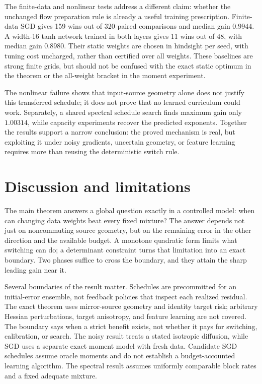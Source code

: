 \documentclass{article}
\theoremstyle{remark}\newtheorem{remark}[theorem]{Remark}
\begin{document}
The finite-data and nonlinear tests address a different claim: whether the unchanged flow preparation rule is already a useful training prescription. Finite-data SGD gives 159 wins out of 320 paired comparisons and median gain $0.9944$. A width-16 tanh network trained in both layers gives 11 wins out of 48, with median gain $0.8980$. Their static weights are chosen in hindsight per seed, with tuning cost uncharged, rather than certified over all weights. These baselines are strong finite grids, but should not be confused with the exact static optimum in the theorem or the all-weight bracket in the moment experiment.

The nonlinear failure shows that input-source geometry alone does not justify this transferred schedule; it does not prove that no learned curriculum could work. Separately, a shared spectral schedule search finds maximum gain only $1.00314$, while capacity experiments recover the predicted exponents. Together the results support a narrow conclusion: the proved mechanism is real, but exploiting it under noisy gradients, uncertain geometry, or feature learning requires more than reusing the deterministic switch rule.

\section{Discussion and limitations}\label{sec:discussion}
The main theorem answers a global question exactly in a controlled model: when can changing data weights beat every fixed mixture? The answer depends not just on noncommuting source geometry, but on the remaining error in the other direction and the available budget. A monotone quadratic form limits what switching can do; a determinant constraint turns that limitation into an exact boundary. Two phases suffice to cross the boundary, and they attain the sharp leading gain near it.

Several boundaries of the result matter. Schedules are precommitted for an initial-error ensemble, not feedback policies that inspect each realized residual. The exact theorem uses mirror-source geometry and identity target risk; arbitrary Hessian perturbations, target anisotropy, and feature learning are not covered. The boundary says when a strict benefit exists, not whether it pays for switching, calibration, or search. The noisy result treats a stated isotropic diffusion, while SGD uses a separate exact moment model with fresh data. Candidate SGD schedules assume oracle moments and do not establish a budget-accounted learning algorithm. The spectral result assumes uniformly comparable block rates and a fixed adequate mixture.
\end{document}

